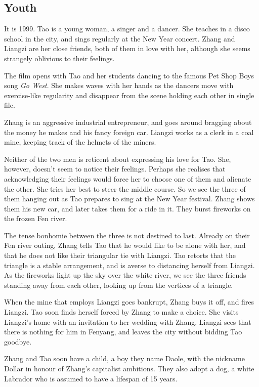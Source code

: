 \documentclass{article}
\begin{document}
\subsection{Youth}
\label{sec:jfdg3q3z}

It is 1999.  Tao is a young woman, a singer and a dancer.  She teaches
in a disco school in the city, and sings regularly at the New Year
concert.  Zhang and Liangzi are her close friends, both of them in
love with her, although she seems strangely oblivious to their
feelings.

The film opens with Tao and her students dancing to the famous Pet
Shop Boys song \emph{Go West}.  She makes waves with her hands as the
dancers move with exercise-like regularity and disappear from the
scene holding each other in single file.

Zhang is an aggressive industrial entrepreneur, and goes around
bragging about the money he makes and his fancy foreign car.  Liangzi
works as a clerk in a coal mine, keeping track of the helmets of the
miners.

Neither of the two men is reticent about expressing his love for Tao.
She, however, doesn't seem to notice their feelings.  Perhaps she
realises that acknowledging their feelings would force her to choose
one of them and alienate the other.  She tries her best to steer the
middle course.  So we see the three of them hanging out as Tao
prepares to sing at the New Year festival.  Zhang shows them his new
car, and later takes them for a ride in it.  They burst fireworks on
the frozen Fen river.

The tense bonhomie between the three is not destined to last.  Already
on their Fen river outing, Zhang tells Tao that he would like to be
alone with her, and that he does not like their triangular tie with
Liangzi.  Tao retorts that the triangle is a stable arrangement, and
is averse to distancing herself from Liangzi.  As the fireworks light
up the sky over the white river, we see the three friends standing
away from each other, looking up from the vertices of a triangle.

When the mine that employs Liangzi goes bankrupt, Zhang buys it off,
and fires Liangzi.  Tao soon finds herself forced by Zhang to make a
choice.  She visits Liangzi's home with an invitation to her wedding
with Zhang.  Liangzi sees that there is nothing for him in Fenyang,
and leaves the city without bidding Tao goodbye.

Zhang and Tao soon have a child, a boy they name Daole, with the
nickname Dollar in honour of Zhang's capitalist ambitions.  They also
adopt a dog, a white Labrador who is assumed to have a lifespan of 15
years.
\end{document}

